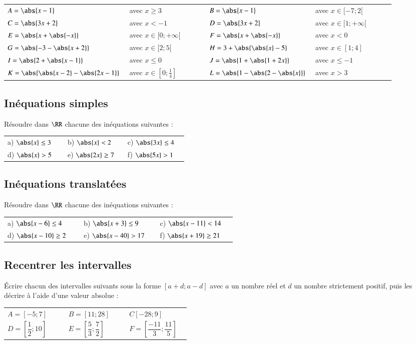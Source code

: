 \documentclass[oneside,12pt]{article}          %
\begin{document}
\begin{tabular}{P{0.25\linewidth} p{0.2\linewidth} | P{0.25\linewidth} p{0.2\linewidth}}
	$A = \abs{x-1}$ & avec $x\geq3$ & $B = \abs{x-1}$ & avec $x\in[-7;2[$ \\
	$C = \abs{3x+2}$ & avec $x<-1$ & $D = \abs{3x+2}$ & avec $x\in[1;+\infty[$ \\
	$E = \abs{x+\abs{-x}}$ & avec $x\in[0;+\infty[$ & $F = \abs{x+\abs{-x}}$ & avec $x<0$ \\
	$G = \abs{-3-\abs{x+2}}$ & avec $x\in[2;5[$ & $H = 3+\abs{\abs{x}-5}$ & avec $x\in[1;4]$ \\
	$I = \abs{2+\abs{x-1}}$ & avec $x\leq0$ & $J = \abs{1+\abs{1+2x}}$ & avec $x\leq-1$ \\
	$K = \abs{\abs{x-2}-\abs{2x-1}}$ & avec $x\in\left[0;\frac{1}{4}\right]$ & $L = \abs{1-\abs{2-\abs{x}}}$ & 		avec $x>3$
\end{tabular}



\subsection{Inéquations simples}
Résoudre dans $\RR$ chacune des inéquations suivantes :

\begin{tabular}{p{0.3\linewidth} p{0.3\linewidth} p{0.3\linewidth}}
	a) $\abs{x}\leq3$ & b) $\abs{x}<2$ & c) $\abs{3x}\leq4$ \\
	d) $\abs{x}>5$ & e) $\abs{2x}\geq7$ & f) $\abs{5x}>1$
\end{tabular}



\subsection{Inéquations translatées}
Résoudre dans $\RR$ chacune des inéquations suivantes :

\begin{tabular}{p{0.3\linewidth} p{0.3\linewidth} p{0.3\linewidth}}
	a) $\abs{x-6}\leq4$ & b) $\abs{x+3}\leq9$ & c) $\abs{x-11}<14$ \\
	d) $\abs{x-10}\geq2$ & e) $\abs{x-40}>17$ & f) $\abs{x+19}\geq21$
\end{tabular}



\subsection{Recentrer les intervalles}
Écrire chacun des intervalles suivants sous la forme $[a+d;a-d]$ avec $a$ un nombre réel et $d$ un nombre strictement positif, puis les décrire à l'aide d'une valeur absolue :

\renewcommand{\arraystretch}{2.5}
\begin{tabular}{p{0.3\linewidth} p{0.3\linewidth} p{0.3\linewidth}}
	$A=[-5;7]$ & $B=[11;28]$ & $C[-28;9]$ \\
	$D=\left[\dfrac{1}{2};10\right]$ & $E=\left[\dfrac{5}{3};\dfrac{7}{2}\right]$ & $F=\left[\dfrac{-11}{3};\dfrac{11}{5}\right]$
\end{tabular}
\end{document}
